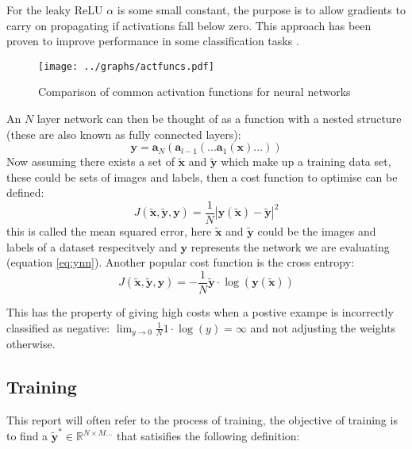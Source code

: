       For the leaky ReLU $\alpha$ is some small constant, the purpose is to allow gradients to carry on
      propagating if activations fall below zero. This approach has been proven to improve performance in some classification
      tasks \cite{Xu2015}.

      \begin{figure} \label{disfagraph}
        \center
        \texttt{[image: ../graphs/actfuncs.pdf]}
        \caption{Comparison of common activation functions for neural networks}
      \end{figure}



      An $N$ layer network can then be thought of as a function with a nested
      structure (these are also known as fully connected layers):
      \begin{equation} \label{eq:ynn}
        \mathbf{y} = \mathbf{a}_{N}(\mathbf{a}_{l-1}(...\mathbf{a}_1(\mathbf{x})...))
      \end{equation}
      Now assuming there exists a set of $\tilde{\mathbf{x}}$ and $\tilde{\mathbf{y}}$ which make
      up a training data set, these could be sets of images and labels, then a cost function
      to optimise can be defined:
      \begin{equation}
        J(\tilde{\mathbf{x}},\tilde{\mathbf{y}},\mathbf{y}) = \frac{1}{N}\left |\mathbf{y}(\tilde{\mathbf{x}})-\tilde{\mathbf{y}}\right | ^2
      \end{equation}
      this is called the mean squared error, here $\tilde{\mathbf{x}}$ and $\tilde{\mathbf{y}}$ could
      be the images and labels of a dataset respecitvely and $\mathbf{y}$ represents the network we are evaluating (equation \ref{eq:ynn}). Another popular cost function is
      the cross entropy:
      \begin{equation}
        J(\tilde{\mathbf{x}},\tilde{\mathbf{y}},\mathbf{y}) = -\frac{1}{N}\tilde{\mathbf{y}}\cdot\log(\mathbf{y}(\tilde{\mathbf{x}}))
      \end{equation}

      This has the property of giving high costs when a postive exampe is incorrectly classified as negative: $\lim _{y\rightarrow0}\frac{1}{N}1\cdot \log(y) = \infty$
      and not adjusting the weights otherwise.

    \subsection{Training}
        This report will often refer to the process of training, the objective of training is to find
        a $\tilde{\mathbf{y}}^* \in \mathbb{R}^{N\times M...}$ that satisifies the following definition:

